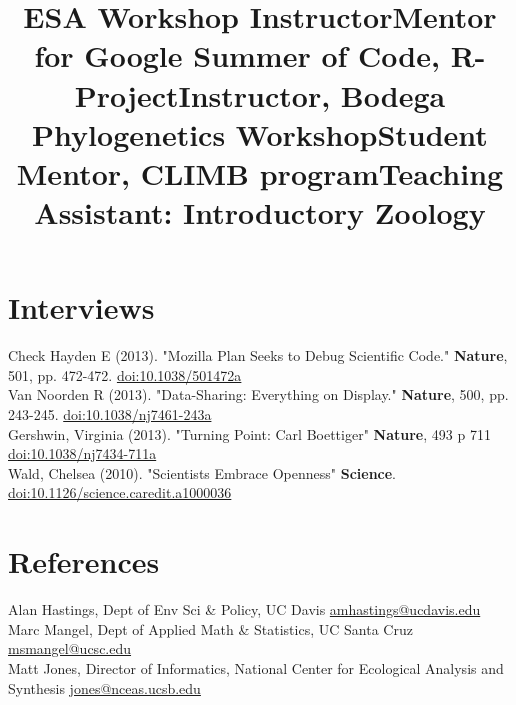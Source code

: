\documentclass[margin]{res}
\begin{document}
\begin{resume}
\title{ESA Workshop Instructor}
\begin{position} \vspace{-.8cm} \end{position}
\title{Mentor for Google Summer of Code, R-Project}
\begin{position} \vspace{-.8cm} \end{position}
\title{Instructor, Bodega Phylogenetics Workshop}
\begin{position} \vspace{-.8cm} \end{position}
\title{Student Mentor, CLIMB program}
\begin{position} \vspace{-.8cm} \end{position}
\title{Teaching Assistant: Introductory Zoology}
 \begin{position} \vspace{-.0cm} \end{position}




\section{Interviews}

Check Hayden E (2013). "Mozilla Plan Seeks to Debug Scientific Code." \textbf{Nature}, 501, pp. 472-472. \href{http://doi.org/10.1038/501472a}{doi:10.1038/501472a} \\ 
Van Noorden R (2013). "Data-Sharing: Everything on Display." \textbf{Nature}, 500, pp. 243-245. \href{http://doi.org/10.1038/nj7461-243a}{doi:10.1038/nj7461-243a} \\
Gershwin, Virginia (2013). "Turning Point: Carl Boettiger" \textbf{Nature}, 493 p 711 \href{http://doi.org/10.1038/nj7434-711a}{doi:10.1038/nj7434-711a} \\
Wald, Chelsea (2010). "Scientists Embrace Openness" \textbf{Science}. \href{http://doi.org/10.1126/science.caredit.a1000036}{doi:10.1126/science.caredit.a1000036} 

\section{References}

Alan Hastings, Dept of Env Sci \& Policy, UC Davis \href{mailto:amhastings@ucdavis.edu}{amhastings@ucdavis.edu} \\ 
Marc Mangel, Dept of Applied Math \& Statistics, UC Santa Cruz \href{mailto:msmangel@ucsc.edu}{msmangel@ucsc.edu} \\
Matt Jones, Director of Informatics, National Center for Ecological Analysis and Synthesis \href{mailto:jones@nceas.ucsv.edu}{jones@nceas.ucsb.edu} \\


\end{resume}
\end{document}
